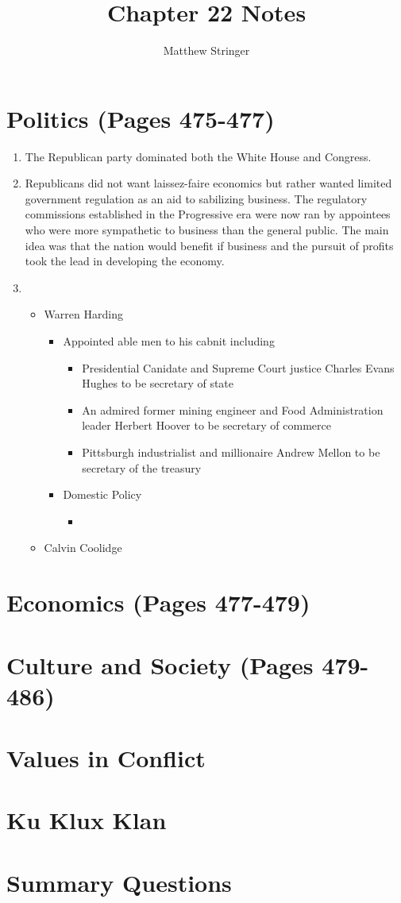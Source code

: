 \documentclass[12pt]{article} %
\title{Chapter 22 Notes} %
\author{Matthew Stringer} %
\begin{document}
\maketitle
\tableofcontents
\newpage

\section{Politics (Pages 475-477)}
\begin{enumerate}
	\item The Republican party dominated both the White House and Congress.
	\item Republicans did not want laissez-faire economics but rather wanted limited government regulation as an aid to sabilizing business.
		The regulatory commissions established in the Progressive era were now ran by appointees who were more sympathetic to business than
		the general public. The main idea was that the nation would benefit if business and the pursuit of profits took the lead in developing
		the economy.
	\item 
	\begin{itemize}
		\item Warren Harding
		\begin{itemize}
			\item Appointed able men to his cabnit including 
			\begin{itemize}
				\item Presidential Canidate and Supreme Court justice Charles Evans Hughes to be secretary of state
				\item An admired former mining engineer and Food Administration leader Herbert Hoover to be \newline secretary of commerce
				\item Pittsburgh industrialist and millionaire Andrew Mellon to be secretary of the treasury
			\end{itemize}
			\item Domestic Policy
			\begin{itemize}
				\item
			\end{itemize}
		\end{itemize}
		\item Calvin Coolidge
	\end{itemize}
\end{enumerate}

\section{Economics (Pages 477-479)}

\section{Culture and Society (Pages 479-486)}

\section{Values in Conflict}

\section{Ku Klux Klan}

\section{Summary Questions}
\end{document}
